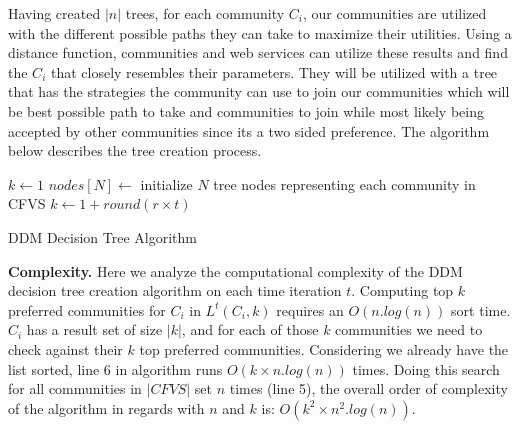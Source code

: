 Having created $|n|$ trees, for each community $C_i$, our communities are utilized with the different possible paths they can take to maximize their utilities. Using a distance function, communities and web services can utilize these results and find the $C_i$ that closely resembles their parameters. They will be utilized with a tree that has the strategies the community can use to join our communities which will be best possible path to take and communities to join while most likely being accepted by other communities since its a two sided preference. The algorithm below describes the tree creation process.

\begin{algorithm}
\DontPrintSemicolon
{}
$k \gets 1$\;
$nodes[N] \gets$ initialize $N$ tree nodes representing each community in CFVS\;
 {
	$k \gets 1 + round (r \times t)$\;
   {
	   {
		}
  }
}
\;
\caption{{\sc DDM Decision Tree Algorithm}}
\label{algo:dectree}
\end{algorithm}

\textbf{Complexity.} Here we analyze the computational complexity of the DDM decision tree creation algorithm on each time iteration $t$. Computing top $k$ preferred communities for $C_i$ in $L^t(C_i, k)$ requires an $O(n.log(n))$ sort time. $C_i$ has a result set of size $|k|$, and for each of those $k$ communities we need to check against their $k$ top preferred communities. Considering we already have the list sorted, line 6 in algorithm runs $O(k \times n.log(n))$ times. Doing this search for all communities in $|CFVS|$ set $n$ times (line 5), the overall order of complexity of the algorithm in regards with $n$ and $k$ is: $O(k^2 \times n^2.log(n))$.

